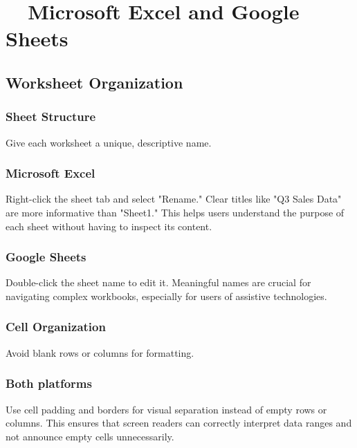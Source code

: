 \section{~~Microsoft Excel and Google Sheets}\label{ch15:sec:excel-sheets}

\subsection{Worksheet Organization}\label{ch15:ssec:worksheet-org}

\subsubsection{Sheet Structure}\label{ch15:sssec:sheet-structure}
Give each worksheet a unique, descriptive name.

\subsubsection{Microsoft Excel}\label{ch15:sssec:excel-sheet-structure}
Right-click the sheet tab and select "Rename." Clear titles like "Q3 Sales Data" are more informative than "Sheet1." This helps users understand the purpose of each sheet without having to inspect its content.

\subsubsection{Google Sheets}\label{ch15:sssec:sheets-sheet-structure}
Double-click the sheet name to edit it. Meaningful names are crucial for navigating complex workbooks, especially for users of assistive technologies.

\subsubsection{Cell Organization}\label{ch15:sssec:cell-org}
Avoid blank rows or columns for formatting.

\subsubsection{Both platforms}\label{ch15:sssec:cell-org-both}
Use cell padding and borders for visual separation instead of empty rows or columns. This ensures that screen readers can correctly interpret data ranges and not announce empty cells unnecessarily.

